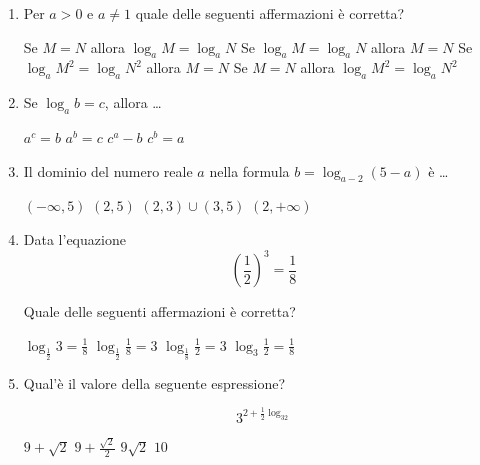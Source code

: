 \begin{enumerate}

\item Per $a>0$ e $a\neq 1$ quale delle seguenti affermazioni è corretta?

\begin{choices}
\choice Se $M=N$ allora $\log_aM=\log_aN$
\choice Se $\log_aM=\log_aN$ allora $M=N$
\choice Se $\log_aM^2=\log_aN^2$ allora $M=N$
\choice Se $M=N$ allora $\log_aM^2=\log_aN^2$
\end{choices}

\item Se $\log_ab=c$, allora \ldots

\begin{choices}
\choice $a^c=b$
\choice $a^b=c$
\choice $c^a-b$
\choice $c^b=a$
\end{choices}

\item Il dominio del numero reale $a$ nella formula $b=\log_{a-2}(5-a)$ è \ldots

\begin{choices}
\choice $(-\infty, 5)$
\choice $(2, 5)$
\choice $(2, 3)\cup(3, 5)$
\choice $(2, +\infty)$
\end{choices}

\item Data l'equazione
\begin{equation*}
\left(\frac{1}{2}\right)^3=\frac{1}{8}
\end{equation*}

Quale delle seguenti affermazioni è corretta?


\begin{choices}
\choice $\log_{\frac{1}{2}}3=\frac{1}{8}$
\choice $\log_{\frac{1}{2}}\frac{1}{8}=3$
\choice $\log_{\frac{1}{8}}\frac{1}{2}=3$
\choice $\log_3\frac{1}{2}=\frac{1}{8}$
\end{choices}

\item Qual'è il valore della seguente espressione?

\begin{equation*}
3^{2+\frac{1}{2}\log_32}
\end{equation*}

\begin{choices}
\choice $9+\sqrt{2}$
\choice $9+\frac{\sqrt{2}}{2}$
\choice $9\sqrt{2}$
\choice $10$
\end{choices}

\end{enumerate}

